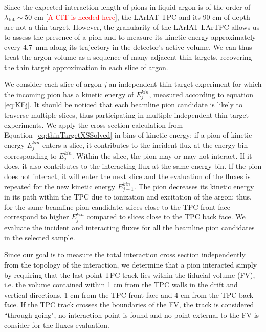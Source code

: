 \documentclass[aps,prl,twocolumn,showpacs,superscriptaddress,groupedaddress]{revtex4}  %
\begin{document}
Since the expected interaction length of pions in liquid argon is of the order of $\lambda_{\text{Int}} \sim 50$ cm [\textcolor{red}{A CIT is needed here}], the LArIAT TPC and its 90 cm of depth are not a thin target. However, the granularity of the LArIAT LArTPC allows us to assess the presence of a pion and to measure its kinetic energy approximately every 4.7~mm along its trajectory in the detector's active volume. We can thus treat the argon volume as a sequence of many adjacent thin targets, recovering the thin target approximation in each slice of argon. 


We consider each slice of argon {\emph{j}} an independent thin target experiment for which the incoming pion has a kinetic energy of  $E^{kin}_j$, measured according to equation \ref{eq:KEj}. It should be noticed that each beamline pion candidate is likely to traverse multiple slices, thus participating in multiple independent thin target experiments.   We apply the cross section calculation from Equation~\ref{eq:thinTargetXSSolved} in bins of kinetic energy: if a pion of kinetic energy $E^{kin}_j$ enters a slice, it contributes to the incident flux at the energy bin corresponding to $E^{kin}_j$.  Within the slice, the pion may or may not interact. If it does, it also contributes to the interacting flux at the same energy bin. If the pion does not interact,  it will enter the next slice and the evaluation of the fluxes is repeated for the new kinetic energy $E^{kin}_{j+1}$. The pion decreases its kinetic energy in its path within the TPC due to ionization and excitation of the argon; thus, for the same beamline pion candidate, slices close to the TPC front face correspond to higher $E^{kin}_j$ compared to slices close to the TPC back face. We evaluate the incident and interacting fluxes for all the beamline pion candidates in the selected sample.  %

Since our goal is to measure the total interaction cross section independently  from the topology of the interaction, we determine that a pion interacted simply by requiring that the last point TPC track lies within the fiducial volume (FV), i.e. the volume contained within 1 cm from the TPC walls in the drift and vertical directions, 1 cm from the TPC front face and 4 cm from the TPC back face.
If the TPC track crosses the boundaries of the FV, the track is considered ``through going", no interaction point is found and no point external to the FV is consider for the fluxes evaluation. 
\end{document}
